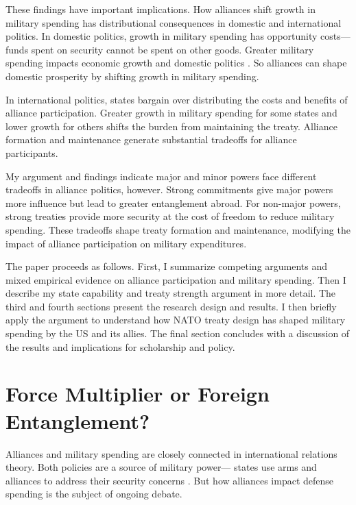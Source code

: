 \documentclass[12pt]{article}
\begin{document}
These findings have important implications. 
How alliances shift growth in military spending has distributional consequences in domestic and international politics.
In domestic politics, growth in military spending has opportunity costs--- funds spent on security cannot be spent on other goods. 
Greater military spending impacts economic growth \citep{ShinWard1999, AlptekinLevine2012} and domestic politics \citep{Narizny2003, WhittenWilliams2011, Williams2015}.
So alliances can shape domestic prosperity by shifting growth in military spending. 


In international politics, states bargain over distributing the costs and benefits of alliance participation.
Greater growth in military spending for some states and lower growth for others shifts the burden from maintaining the treaty. 
Alliance formation and maintenance generate substantial tradeoffs for alliance participants.  


My argument and findings indicate major and minor powers face different tradeoffs in alliance politics, however.
Strong commitments give major powers more influence but lead to greater entanglement abroad.
For non-major powers, strong treaties provide more security at the cost of freedom to reduce military spending. 
These tradeoffs shape treaty formation and maintenance, modifying the impact of alliance participation on military expenditures. 


The paper proceeds as follows. 
First, I summarize competing arguments and mixed empirical evidence on alliance participation and military spending. 
Then I describe my state capability and treaty strength argument in more detail. 
The third and fourth sections present the research design and results. 
I then briefly apply the argument to understand how NATO treaty design has shaped military spending by the US and its allies. 
The final section concludes with a discussion of the results and implications for scholarship and policy.  


\section{Force Multiplier or Foreign Entanglement?}


Alliances and military spending are closely connected in international relations theory. 
Both policies are a source of military power--- states use arms and alliances to address their security concerns \citep{Morrow1993}. 
But how alliances impact defense spending is the subject of ongoing debate. 
\end{document}
